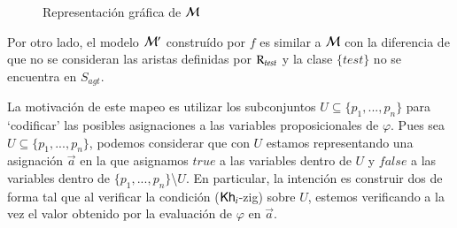 \begin{ejemplo}
\begin{figure}[t]
        \hspace{1.4cm}
        \caption{Representación gráfica de $\mathcal{M}$}
        \label{fig:karp-reduction}
    \end{figure}

    Por otro lado, el modelo $\mathcal{M}'$ construído por $f$ es similar a $\mathcal{M}$ con la diferencia de que no se consideran las aristas 
    definidas por $\mathrm{R}_{test}$ y la clase $\{test\}$ no se encuentra en $S_{agt}$.
\end{ejemplo}

La motivación de este mapeo es utilizar los subconjuntos $U \subseteq \{p_1,...,p_n\}$ para `codificar' las posibles 
asignaciones a las variables proposicionales de $\varphi$. Pues sea $U \subseteq \{p_1,...,p_n\}$, podemos considerar que con $U$ estamos representando una asignación 
$\overrightarrow{a}$ en la que asignamos $true$ a las variables dentro de $U$ y $false$ a las variables dentro de 
$\{p_1,...,p_n\}$\textbackslash$U$. En particular, la intención es construir dos \ults de forma tal que al verificar la condición ($\mathsf{Kh}_i$-zig) sobre $U$, estemos 
verificando a la vez el valor obtenido por la evaluación de $\varphi$ en $\overrightarrow{a}$.

